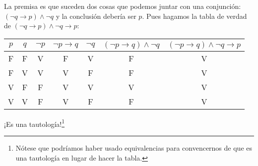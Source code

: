 \documentclass{book}
\theoremstyle{definition}
\begin{document}
La premisa es que suceden dos cosas que podemos juntar con una conjunción: $(\neg q \rightarrow p) \wedge \neg q$ y la conclusión debería ser $p$. Pues hagamos la tabla de verdad de $(\neg q \rightarrow p) \wedge \neg q \rightarrow p$:
\begin{center}\begin{tabular}{|c|c||c|c|c|c|c|}
	\hline
	$p$ & $q$ & $\neg p$ & $\neg p \rightarrow q$ & $\neg q$ & $(\neg p \rightarrow q)\wedge \neg q$ & $(\neg p \rightarrow q)\wedge \neg q \rightarrow p$ \\
	\hline \hline
	F&F&V&F&V&F&V\\ \hline
	F&V&V&V&F&F&V\\ \hline
	V&F&F&V&V&V&V\\ \hline
	V&V&F&V&F&F&V\\ \hline
\end{tabular}\end{center}
¡Es una tautología!\footnote{Nótese que podríamos haber usado equivalencias para convencernos de que es una tautología en lugar de hacer la tabla.}
\end{document}
